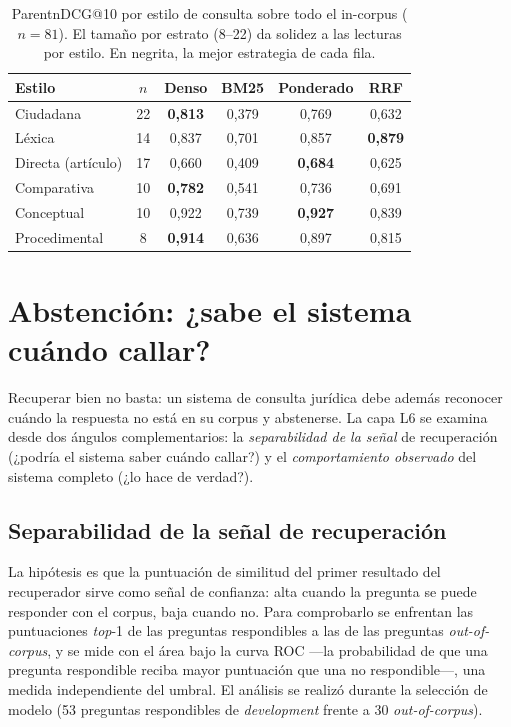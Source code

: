 \begin{table}[htbp]
    \centering
    \footnotesize
    \renewcommand{\arraystretch}{1.2}
    \caption{ParentnDCG@10 por estilo de consulta sobre todo el in-corpus ($n=81$). El tamaño por estrato (8--22) da solidez a las lecturas por estilo. En negrita, la mejor estrategia de cada fila.}
    \label{tab:flagship-estilo-n81}
    \begin{tabular}{|l|c|c|c|c|c|}
        \hline
        \textbf{Estilo} & \textbf{$n$} & \textbf{Denso} & \textbf{BM25} & \textbf{Ponderado} & \textbf{RRF} \\
        \hline
        Ciudadana          & 22 & \textbf{0,813} & 0,379 & 0,769 & 0,632 \\
        Léxica             & 14 & 0,837 & 0,701 & 0,857 & \textbf{0,879} \\
        Directa (artículo) & 17 & 0,660 & 0,409 & \textbf{0,684} & 0,625 \\
        Comparativa        & 10 & \textbf{0,782} & 0,541 & 0,736 & 0,691 \\
        Conceptual         & 10 & 0,922 & 0,739 & \textbf{0,927} & 0,839 \\
        Procedimental      &  8 & \textbf{0,914} & 0,636 & 0,897 & 0,815 \\
        \hline
    \end{tabular}
\end{table}

\section{Abstención: ¿sabe el sistema cuándo callar?}
\label{sec:abstencion}

Recuperar bien no basta: un sistema de consulta jurídica debe además reconocer cuándo la respuesta no está en su corpus y abstenerse. La capa L6 se examina desde dos ángulos complementarios: la \emph{separabilidad de la señal} de recuperación (¿podría el sistema saber cuándo callar?) y el \emph{comportamiento observado} del sistema completo (¿lo hace de verdad?).

\subsection{Separabilidad de la señal de recuperación}
\label{subsec:abstencion-senal}

La hipótesis es que la puntuación de similitud del primer resultado del recuperador sirve como señal de confianza: alta cuando la pregunta se puede responder con el corpus, baja cuando no. Para comprobarlo se enfrentan las puntuaciones \emph{top}-1 de las preguntas respondibles a las de las preguntas \emph{out-of-corpus}, y se mide con el área bajo la curva ROC —la probabilidad de que una pregunta respondible reciba mayor puntuación que una no respondible—, una medida independiente del umbral. El análisis se realizó durante la selección de modelo (53 preguntas respondibles de \emph{development} frente a 30 \emph{out-of-corpus}).


